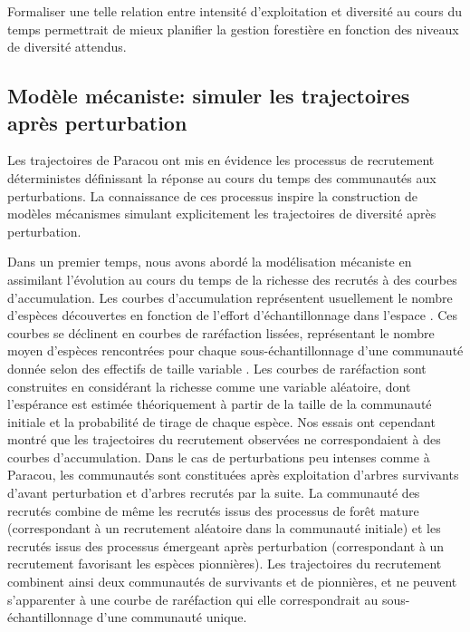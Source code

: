 \documentclass[
  11pt,
  french,
  A4paper,
  extrafontsizes,onecolumn,openright
  ]{memoir}
\begin{document}
Formaliser une telle relation entre intensité d'exploitation et
diversité au cours du temps permettrait de mieux planifier la gestion
forestière en fonction des niveaux de diversité attendus.

\subsection{Modèle mécaniste: simuler les trajectoires après
perturbation}\label{modele-mecaniste-simuler-les-trajectoires-apres-perturbation}

Les trajectoires de Paracou ont mis en évidence les processus de
recrutement déterministes définissant la réponse au cours du temps des
communautés aux perturbations. La connaissance de ces processus inspire
la construction de modèles mécanismes simulant explicitement les
trajectoires de diversité après perturbation.

Dans un premier temps, nous avons abordé la modélisation mécaniste en
assimilant l'évolution au cours du temps de la richesse des recrutés à
des courbes d'accumulation. Les courbes d'accumulation représentent
usuellement le nombre d'espèces découvertes en fonction de l'effort
d'échantillonnage dans l'espace \autocite{Gotelli2001}. Ces courbes se
déclinent en courbes de raréfaction lissées, représentant le nombre
moyen d'espèces rencontrées pour chaque sous-échantillonnage d'une
communauté donnée selon des effectifs de taille variable
\autocite{Ugland2003}. Les courbes de raréfaction sont construites en
considérant la richesse comme une variable aléatoire, dont l'espérance
est estimée théoriquement à partir de la taille de la communauté
initiale et la probabilité de tirage de chaque espèce. Nos essais ont
cependant montré que les trajectoires du recrutement observées ne
correspondaient à des courbes d'accumulation. Dans le cas de
perturbations peu intenses comme à Paracou, les communautés sont
constituées après exploitation d'arbres survivants d'avant perturbation
et d'arbres recrutés par la suite. La communauté des recrutés combine de
même les recrutés issus des processus de forêt mature (correspondant à
un recrutement aléatoire dans la communauté initiale) et les recrutés
issus des processus émergeant après perturbation (correspondant à un
recrutement favorisant les espèces pionnières). Les trajectoires du
recrutement combinent ainsi deux communautés de survivants et de
pionnières, et ne peuvent s'apparenter à une courbe de raréfaction qui
elle correspondrait au sous-échantillonnage d'une communauté unique.
\end{document}
